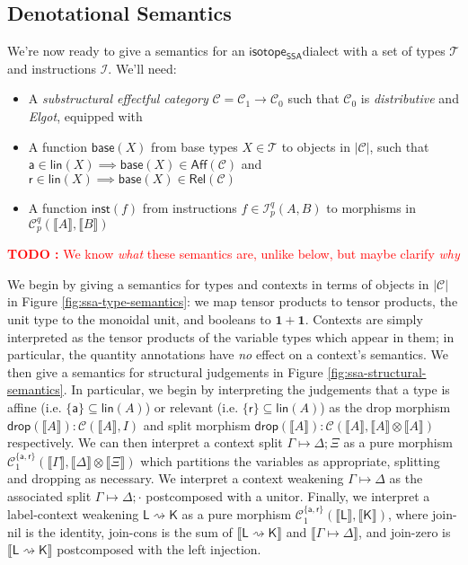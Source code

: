 \documentclass[acmsmall,screen,review]{acmart}
\newcounter{todos}
\newcommand{\TODO}[1]{{
  \stepcounter{todos}
  \begin{center}\large{\textcolor{red}{\textbf{TODO \arabic{todos}:} #1}}\end{center}
}}
\newcommand{\mc}[1]{\ensuremath{\mathcal{#1}}}
\newcommand{\mb}[1]{\ensuremath{\mathbf{#1}}}
\newcommand{\ms}[1]{\ensuremath{\mathsf{#1}}}
\newcommand{\csplits}[3]{#1 \mapsto #2;#3}
\newcommand{\cwk}[2]{#1 \mapsto #2}
\newcommand{\lwk}[2]{#1 \rightsquigarrow #2}
\newcommand{\tlin}[2]{#2 \subseteq \ms{lin}(#1)}
\newcommand{\rle}[1]{{\scriptsize\textsf{#1}}}
\newcommand{\taff}{{\{\ms{a}\}}}
\newcommand{\trel}{{\{\ms{r}\}}}
\newcommand{\tint}{{\{\ms{a}, \ms{r}\}}}
\newcommand{\dnt}[1]{\llbracket{#1}\rrbracket}
\newcommand{\isotopessa}{\ms{isotope_{SSA}}}
\begin{document}
\subsection{Denotational Semantics}

We're now ready to give a semantics for an \isotopessa dialect with a set of
types \(\mc{T}\) and instructions \(\mc{I}\). We'll need:
\begin{itemize}
  \item A \textit{substructural effectful category} \(\mc{C} = \mc{C}_1 \to
  \mc{C}_0\) such that \(\mc{C}_0\) is \textit{distributive} and \textit{Elgot},
  equipped with
  \item A function \(\ms{base}(X)\) from base types \(X \in \mc{T}\) to objects
  in \(|\mc{C}|\), such that \(\ms{a} \in \ms{lin}(X) \implies \ms{base}(X) \in
  \ms{Aff}(\mc{C})\) and \(\ms{r} \in \ms{lin}(X) \implies \ms{base}(X) \in
  \ms{Rel}(\mc{C})\)
  \item A function \(\ms{inst}(f)\) from instructions \(f \in \mc{I}_p^q(A, B)\)
  to morphisms in \(\mc{C}_p^q(\dnt{A}, \dnt{B})\)
\end{itemize}

\TODO{We know \textit{what} these semantics are, unlike below, but maybe clarify
\textit{why}} 

We begin by giving a semantics for types and contexts in terms of objects in
\(|\mc{C}|\) in Figure \ref{fig:ssa-type-semantics}: we map tensor products to
tensor products, the unit type to the monoidal unit, and booleans to \(\mb{1} +
\mb{1}\). Contexts are simply interpreted as the tensor products of the variable
types which appear in them; in particular, the quantity annotations have
\textit{no} effect on a context's semantics. We then give a semantics for
structural judgements in Figure \ref{fig:ssa-structural-semantics}. In
particular, we begin by interpreting the judgements that a type is affine (i.e.
\(\tlin{A}{\taff}\)) or relevant (i.e. \(\tlin{A}{\trel}\)) as the drop morphism
\(\ms{drop}(\dnt{A}): \mc{C}(\dnt{A}, I)\) and split morphism
\(\ms{drop}(\dnt{A}): \mc{C}(\dnt{A}, \dnt{A} \otimes \dnt{A})\) respectively.
We can then interpret a context split \(\csplits{\Gamma}{\Delta}{\Xi}\) as a
pure morphism \(\mc{C}^\tint_1(\dnt{\Gamma}, \dnt{\Delta} \otimes \dnt{\Xi})\)
which partitions the variables as appropriate, splitting and dropping as
necessary. We interpret a context weakening \(\cwk{\Gamma}{\Delta}\) as the
associated split \(\csplits{\Gamma}{\Delta}{\cdot}\) postcomposed with a unitor.
Finally, we interpret a label-context weakening \(\lwk{\ms{L}}{\ms{K}}\) as a
pure morphism \(\mc{C}^\tint_1(\dnt{\ms{L}}, \dnt{\ms{K}})\), where
\rle{join-nil} is the identity, \rle{join-cons} is the sum of
\(\dnt{\lwk{\ms{L}}{\ms{K}}}\) and \(\dnt{\cwk{\Gamma}{\Delta}}\), and
\rle{join-zero} is \(\dnt{\lwk{\ms{L}}{\ms{K}}}\) postcomposed with the left
injection.
\end{document}
